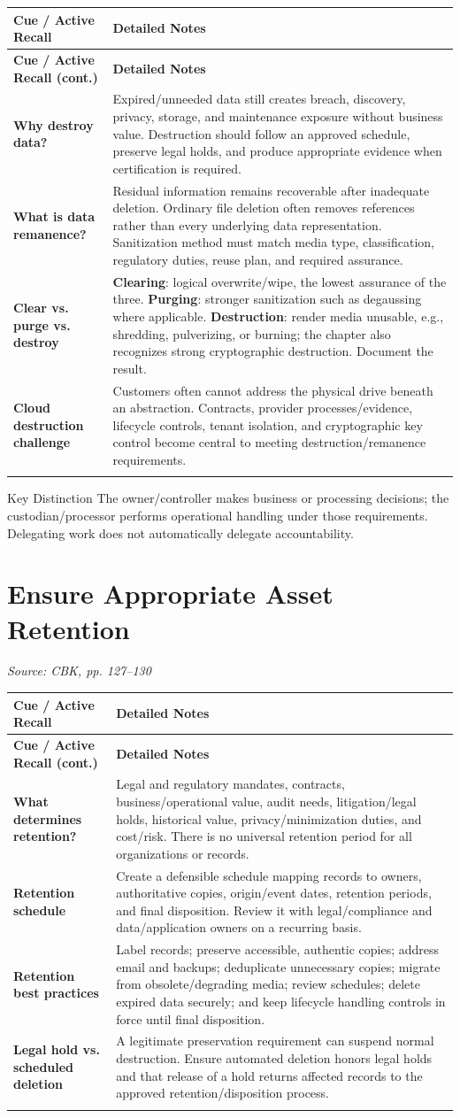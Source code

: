 \documentclass[10pt,letterpaper]{article}
\makeatletter
\newenvironment{cornell}
{\rowcolors{2}{white}{notebg}\begin{longtable}{@{}>{\raggedright\arraybackslash\columncolor{cuebg}\color{navy}\bfseries}p{0.285\textwidth}>{\raggedright\arraybackslash}p{0.65\textwidth}@{}}
\rowcolor{navy}\color{white}\textbf{Cue / Active Recall} & \color{white}\textbf{Detailed Notes}\\ \hline\endfirsthead
\rowcolor{navy}\color{white}\textbf{Cue / Active Recall (cont.)} & \color{white}\textbf{Detailed Notes}\\ \hline\endhead}{\end{longtable}}
\newcommand{\noterow}[2]{#1 & #2\\\arrayrulecolor{line}\hline}
\newcommand{\source}[1]{\par{\footnotesize\color{teal}\textit{Source: CBK, #1}}\par}
\makeatother
\begin{document}
\begin{cornell}
\noterow{Why destroy data?}{Expired/unneeded data still creates breach, discovery, privacy, storage, and maintenance exposure without business value. Destruction should follow an approved schedule, preserve legal holds, and produce appropriate evidence when certification is required.}
\noterow{What is data remanence?}{Residual information remains recoverable after inadequate deletion. Ordinary file deletion often removes references rather than every underlying data representation. Sanitization method must match media type, classification, regulatory duties, reuse plan, and required assurance.}
\noterow{Clear vs. purge vs. destroy}{\textbf{Clearing}: logical overwrite/wipe, the lowest assurance of the three. \textbf{Purging}: stronger sanitization such as degaussing where applicable. \textbf{Destruction}: render media unusable, e.g., shredding, pulverizing, or burning; the chapter also recognizes strong cryptographic destruction. Document the result.}
\noterow{Cloud destruction challenge}{Customers often cannot address the physical drive beneath an abstraction. Contracts, provider processes/evidence, lifecycle controls, tenant isolation, and cryptographic key control become central to meeting destruction/remanence requirements.}
\end{cornell}

\begin{exambox}{Key Distinction}
The owner/controller makes business or processing decisions; the custodian/processor performs operational handling under those requirements. Delegating work does not automatically delegate accountability.
\end{exambox}

\section{\color{navy}Ensure Appropriate Asset Retention}
\source{pp. 127--130}
\begin{cornell}
\noterow{What determines retention?}{Legal and regulatory mandates, contracts, business/operational value, audit needs, litigation/legal holds, historical value, privacy/minimization duties, and cost/risk. There is no universal retention period for all organizations or records.}
\noterow{Retention schedule}{Create a defensible schedule mapping records to owners, authoritative copies, origin/event dates, retention periods, and final disposition. Review it with legal/compliance and data/application owners on a recurring basis.}
\noterow{Retention best practices}{Label records; preserve accessible, authentic copies; address email and backups; deduplicate unnecessary copies; migrate from obsolete/degrading media; review schedules; delete expired data securely; and keep lifecycle handling controls in force until final disposition.}
\noterow{Legal hold vs. scheduled deletion}{A legitimate preservation requirement can suspend normal destruction. Ensure automated deletion honors legal holds and that release of a hold returns affected records to the approved retention/disposition process.}
\end{cornell}
\end{document}
